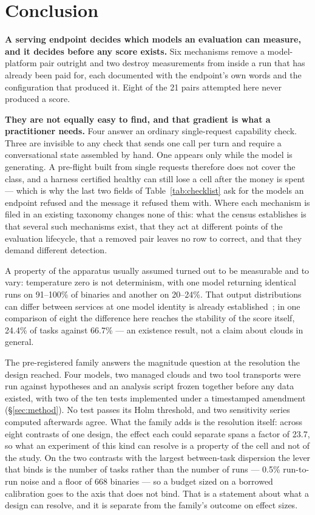 \section{Conclusion}
\label{sec:conclusion}

\textbf{A serving endpoint decides which models an evaluation can measure, and it decides before any score
exists.} Six mechanisms remove a model-platform pair outright and two destroy measurements from inside a
run that has already been paid for, each documented with the endpoint's own words and the configuration
that produced it. Eight of the 21 pairs attempted here never produced a score.

\textbf{They are not equally easy to find, and that gradient is what a practitioner needs.} Four answer an
ordinary single-request capability check. Three are invisible to any check that sends one call per turn and
require a conversational state assembled by hand. One appears only while the model is generating. A
pre-flight built from single requests therefore does not cover the class, and a harness certified healthy
can still lose a cell after the money is spent --- which is why the last two fields of
Table~\ref{tab:checklist} ask for the models an endpoint refused and the message it refused them with.
Where each mechanism is filed in an existing taxonomy changes none of this: what the census establishes is
that several such mechanisms exist, that they act at different points of the evaluation lifecycle, that a
removed pair leaves no row to correct, and that they demand different detection.

A property of the apparatus usually assumed turned out to be measurable and to vary: temperature zero is
not determinism, with one model returning identical runs on 91--100\% of binaries and another on 20--24\%.
That output distributions can differ between services at one model identity is already
established~\citep{gao2025equality}; in one comparison of eight the difference here reaches the stability
of the score itself, 24.4\% of tasks against 66.7\% --- an existence result, not a claim about clouds in
general.

The pre-registered family answers the magnitude question at the resolution the design reached. Four models,
two managed clouds and two tool transports were run against hypotheses and an analysis script frozen
together before any data existed, with two of the ten tests implemented under a timestamped amendment
(\S\ref{sec:method}). No test passes its Holm threshold, and two sensitivity series computed afterwards
agree. What the family adds is the resolution itself: across eight contrasts of one design, the effect each
could separate spans a factor of 23.7, so what an experiment of this kind can resolve is a property of the
cell and not of the study. On the two contrasts with the largest between-task dispersion the lever that binds is
the number of tasks rather than the number of runs --- 0.5\% run-to-run noise and a floor of 668 binaries
--- so a budget sized on a borrowed calibration goes to the axis that does not bind. That is a statement
about what a design can resolve, and it is separate from the family's outcome on effect sizes.

